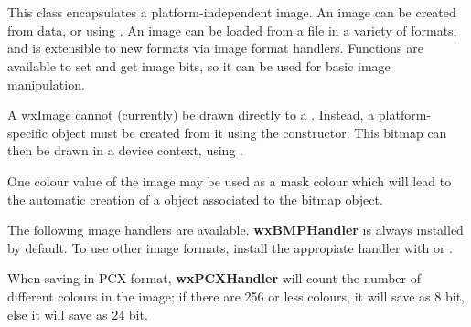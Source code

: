 \section{}\label{wximage}

This class encapsulates a platform-independent image. An image can be created
from data, or using . An image
can be loaded from a file in a variety of formats, and is extensible to new formats
via image format handlers. Functions are available to set and get image bits, so
it can be used for basic image manipulation.

A wxImage cannot (currently) be drawn directly to a . Instead, 
a platform-specific  object must be created from it using
the  constructor. 
This bitmap can then
be drawn in a device context, using .

One colour value of the image may be used as a mask colour which will lead to the automatic
creation of a  object associated to the bitmap object.


The following image handlers are available. {\bf wxBMPHandler} is always
installed by default. To use other image formats, install the appropiate
handler with  or 
.

\twocolwidtha{5cm}%
\begin{twocollist}
\end{twocollist}

When saving in PCX format, {\bf wxPCXHandler} will count the number of
different colours in the image; if there are 256 or less colours, it will
save as 8 bit, else it will save as 24 bit.

